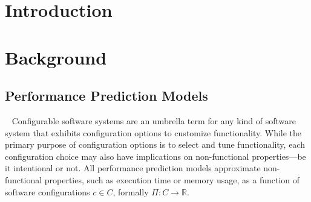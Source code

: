 \section{Introduction}


\section{Background}
\subsection{Performance Prediction Models}~\label{sec:perfmodels}
Configurable software systems are an umbrella term for any kind of software system that exhibits configuration options to customize functionality. While the primary purpose of configuration options is to select and tune functionality, each configuration choice may also have implications on non-functional properties---be it intentional or not. 
All performance prediction models approximate non-functional properties, such as execution time or memory usage, as a function of software configurations $c \in C$, formally $\Pi: C \rightarrow \mathbb{R}$. 



